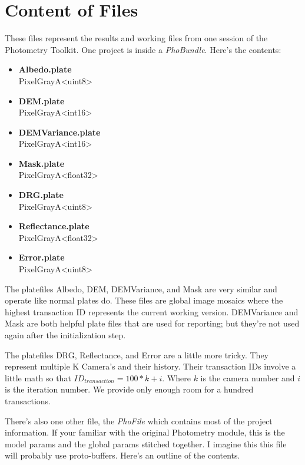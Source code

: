 \section{Content of Files}

These files represent the results and working files from one session
of the Photometry Toolkit. One project is inside a
\emph{PhoBundle}. Here's the contents:

\begin{itemize}
  \item \textbf{Albedo.plate} \hfill \\
    PixelGrayA<uint8>
  \item \textbf{DEM.plate} \hfill \\
    PixelGrayA<int16>
  \item \textbf{DEMVariance.plate} \hfill \\
    PixelGrayA<int16>
  \item \textbf{Mask.plate} \hfill \\
    PixelGrayA<float32>
  \item \textbf{DRG.plate} \hfill \\
    PixelGrayA<uint8>
  \item \textbf{Reflectance.plate} \hfill \\
    PixelGrayA<float32>
  \item \textbf{Error.plate} \hfill \\
    PixelGrayA<uint8>
\end{itemize}

The platefiles Albedo, DEM, DEMVariance, and Mask are very similar and
operate like normal plates do. These files are global image mosaics
where the highest transaction ID represents the current working
version. DEMVariance and Mask are both helpful plate files that are
used for reporting; but they're not used again after the
initialization step.

The platefiles DRG, Reflectance, and Error are a little more
tricky. They represent multiple K Camera's and their history. Their
transaction IDs involve a little math so that $ID_{transaction} =
100*k+i$. Where $k$ is the camera number and $i$ is the iteration
number. We provide only enough room for a hundred transactions.

There's also one other file, the \emph{PhoFile} which contains most of
the project information. If your familiar with the original Photometry
module, this is the model params and the global params stitched
together. I imagine this this file will probably use
proto-buffers. Here's an outline of the contents.

